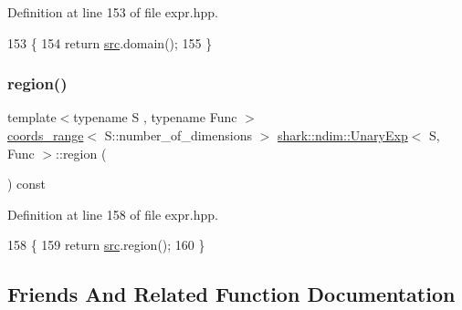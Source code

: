 Definition at line 153 of file expr.\+hpp.


\begin{DoxyCode}
153                                                                                    \{
154             \textcolor{keywordflow}{return} \hyperlink{classshark_1_1ndim_1_1_unary_exp_ad43011a53ffbee999334c7cc52fb95ad}{src}.domain();
155         \}
\end{DoxyCode}
\hypertarget{classshark_1_1ndim_1_1_unary_exp_ab5cbee53029546b1c0f87f98c4f34616}{}\label{classshark_1_1ndim_1_1_unary_exp_ab5cbee53029546b1c0f87f98c4f34616} 
\subsubsection{\texorpdfstring{region()}{region()}}
{\footnotesize\ttfamily template$<$typename S , typename Func $>$ \\
\hyperlink{structshark_1_1ndim_1_1coords__range}{coords\+\_\+range}$<$ S\+::number\+\_\+of\+\_\+dimensions $>$ \hyperlink{classshark_1_1ndim_1_1_unary_exp}{shark\+::ndim\+::\+Unary\+Exp}$<$ S, Func $>$\+::region (\begin{DoxyParamCaption}{ }\end{DoxyParamCaption}) const\hspace{0.3cm}{\ttfamily [inline]}}



Definition at line 158 of file expr.\+hpp.


\begin{DoxyCode}
158                                                                                   \{
159             \textcolor{keywordflow}{return} \hyperlink{classshark_1_1ndim_1_1_unary_exp_ad43011a53ffbee999334c7cc52fb95ad}{src}.region();
160         \}
\end{DoxyCode}


\subsection{Friends And Related Function Documentation}
\hypertarget{classshark_1_1ndim_1_1_unary_exp_a022f283e42a9d39735bdcf5d954349f1}{}\label{classshark_1_1ndim_1_1_unary_exp_a022f283e42a9d39735bdcf5d954349f1} 
